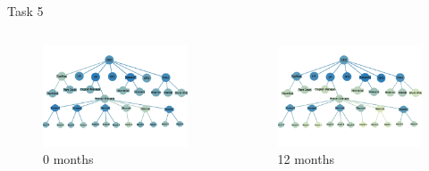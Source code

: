 \documentclass{beamer}
\begin{document}
\begin{frame}{Task 5}

\begin{columns}
\begin{figure}
\centering
\includegraphics[width=\textwidth]{fig/task-5-1.pdf}
\caption{0 months}
\end{figure}




\begin{figure}
\centering
\includegraphics[width=\textwidth]{fig/task-5-2.pdf}
\caption{12 months}
\end{figure}



\end{columns}

\end{frame}
\end{document}
